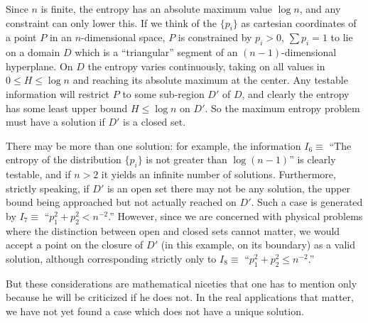 Since $n$ is finite, the entropy has an absolute maximum value $\log n$, and any constraint can only lower this.
If we think of the $\{p_i\}$ as cartesian coordinates of a point $P$ in an $n$-dimensional space, $P$ is constrained by $p_i > 0$, $\sum p_i=1$ to lie on a domain $D$ which is a ``triangular'' segment of an $(n-1)$-dimensional hyperplane.
On $D$ the entropy varies continuously, taking on all values in $0 \leq H \leq \log n$ and reaching its absolute maximum at the center.
Any testable information will restrict $P$ to some sub-region $D'$ of $D$, and clearly the entropy has some least upper bound $H \leq \log n$ on $D'$.
So the maximum entropy problem must have a solution if $D'$ is a closed set.

There may be more than one solution: for example, the information $I_6 \equiv$ ``The entropy of the distribution $\{p_i\}$ is not greater than $\log(n-1)$'' is clearly testable, and if $n>2$ it yields an infinite number of solutions.
Furthermore, strictly speaking, if $D'$ is an open set there may not be any solution, the upper bound being approached but not actually reached on $D'$.
Such a case is generated by $I_7 \equiv$ ``$p_1^2 + p_2^2 < n^{-2}$.''
However, since we are concerned with physical problems where the distinction between open and closed sets cannot matter, we would accept a point on the closure of $D'$ (in this example, on its boundary) as a valid solution, although corresponding strictly only to $I_8 \equiv$ ``$p_1^2 + p_2^2 \leq n^{-2}$.''

But these considerations are mathematical niceties that one has to mention only because he will be criticized if he does not.
In the real applications that matter, we have not yet found a case which does not have a unique solution.

